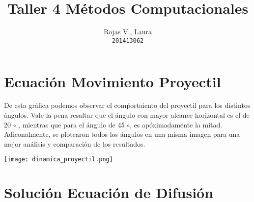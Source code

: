 \documentclass{article}
\title{\vspace{-15mm}\fontsize{20pt}{12pt}\selectfont\textbf{Taller 4 Métodos Computacionales}}
\date{\vspace{-5ex}}
\author{
    Rojas V., Laura  \\
  \texttt{201413062}
  }
\begin{document}
\maketitle
\thispagestyle{fancy}


\section{Ecuación Movimiento Proyectil}

De esta gráfica podemos observar el comṕortaiento del proyectil para los distintos ángulos. Vale la pena resaltar que el ángulo con mayor alcance horizontal es el de 20 $\circ$ , mientras que para el ángulo de 45 $\circ$, es apóximadamente la mitad. Adiconalmente, se plotearon todos los ángulos en una misma imagen para una mejor análisis y comparación de los resultados.

{
\texttt{[image: dinamica\_proyectil.png]}
}


\section{Solución Ecuación de Difusión}
\end{document}
